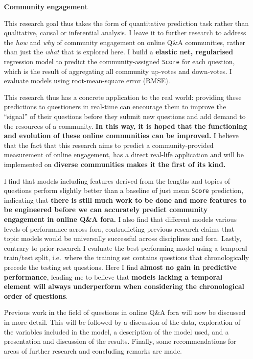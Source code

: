 \documentclass[11pt,preprint, authoryear]{article}
\numberwithin{equation}{section}
\begin{document}
\textbf{Community engagement}

This research goal thus takes the form of quantitative prediction task
rather than qualitative, causal or inferential analysis. I leave it to
further research to address the \emph{how} and \emph{why} of community
engagement on online Q\&A communities, rather than just the \emph{what}
that is explored here. I build a \textbf{elastic net, regularised}
regression model to predict the community-assigned \texttt{Score} for
each question, which is the result of aggregating all community up-votes
and down-votes. I evaluate models using root-mean-square error (RMSE).

This research thus has a concrete application to the real world:
providing these predictions to questioners in real-time can encourage
them to improve the ``signal'' of their questions before they submit new
questions and add demand to the resources of a community. \textbf{In
this way, it is hoped that the functioning and evolution of these online
communities can be improved.} I believe that the fact that this research
aims to predict a community-provided measurement of online engagement,
has a direct real-life application and will be implemented on
\textbf{diverse communities makes it the first of its kind.}

I find that models including features derived from the lengths and
topics of questions perform slightly better than a baseline of just mean
\texttt{Score} prediction, indicating that \textbf{there is still much
work to be done and more features to be engineered before we can
accurately predict community engagement in online Q\&A fora.} I also
find that different models various levels of performance across fora,
contradicting previous research claims that topic models would be
universally successful across disciplines and fora. Lastly, contrary to
prior research I evaluate the best performing model using a temporal
train/test split, i.e.~where the training set contains questions that
chronologically precede the testing set questions. Here I find
\textbf{almost no gain in predictive performance}, leading me to believe
that \textbf{models lacking a temporal element will always underperform
when considering the chronological order of questions}.

Previous work in the field of questions in online Q\&A fora will now be
discussed in more detail. This will be followed by a discussion of the
data, exploration of the variables included in the model, a description
of the model used, and a presentation and discussion of the results.
Finally, some recommendations for areas of further research and
concluding remarks are made.
\end{document}
